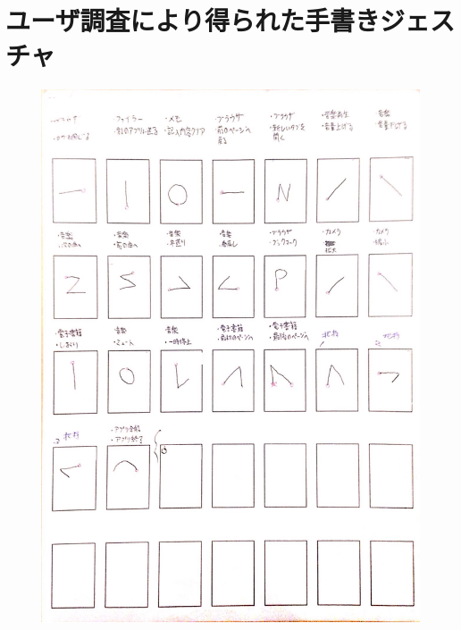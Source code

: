 \chapter{ユーザ調査により得られた手書きジェスチャ}

\begin{figure} [p]
 \begin{center}
  \includegraphics [width=1.0\columnwidth]{img/P1.eps}
  \label{fig:elicitation_example}
 \end{center}
\end{figure}

